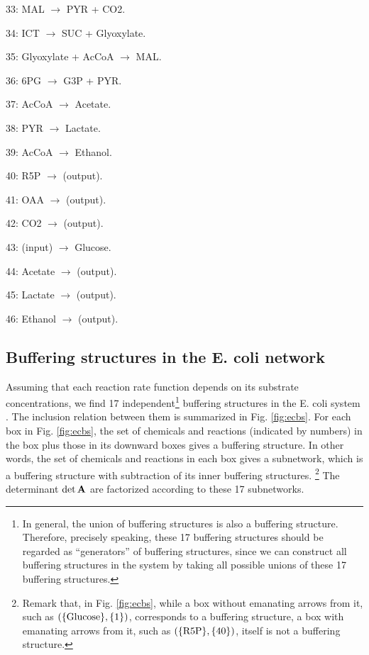 \documentclass[ amsmath,amssymb,nofootinbib
]{revtex4-1}
\newcommand{\detA}{{\rm det}\,  {\bf A}}
\begin{document}
{ 33: MAL  $\rightarrow$   PYR  +  CO2.

34: ICT   $\rightarrow$  SUC  +  Glyoxylate. 

 35: Glyoxylate  +  AcCoA  $\rightarrow$  MAL. 

 36: 6PG  $\rightarrow$   G3P  +  PYR. 

 37: AcCoA  $\rightarrow$   Acetate. 

38:  PYR  $\rightarrow$  Lactate. 

 39: AcCoA  $\rightarrow$  Ethanol. 

 40: R5P  $\rightarrow$ (output).

 41: OAA  $\rightarrow$ (output).

 42: CO2  $\rightarrow$ (output).

43:  (input) $\rightarrow$  Glucose. 

 44:  Acetate $\rightarrow$ (output).
 
  45: Lactate $\rightarrow$ (output).

46:  Ethanol $\rightarrow$ (output).
}


\subsection{Buffering structures in the E. coli network}\label{sec:bsec}
Assuming that each reaction rate function depends on its substrate concentrations, we find 17 independent\footnote{In general, the union of buffering structures is also a buffering structure. Therefore, precisely speaking, these 17 buffering structures should be regarded as ``generators'' of  buffering structures, since  we can construct all buffering structures in the system by taking all possible unions of these 17 buffering structures. }  buffering structures in the E. coli system \cite{OM}. The inclusion relation between them is summarized in Fig. \ref{fig:ecbs}. For each box in Fig. \ref{fig:ecbs},  the set of chemicals and reactions (indicated by numbers) in the box plus those in its downward boxes gives a buffering structure. In other words, the set of chemicals and reactions in each box gives a subnetwork, which is a buffering structure with subtraction of its inner buffering structures.  
\footnote{Remark that,  in Fig. \ref{fig:ecbs},  while a box without emanating arrows from it, such as $( \{\rm Glucose\} ,\{1 \})$, corresponds to a buffering structure, a box with emanating arrows from it, such as $( \{\rm R5P\} ,\{40 \})$,  itself is  not a buffering structure. } The determinant $\detA$ are factorized according to these 17 subnetworks. 
\end{document}
